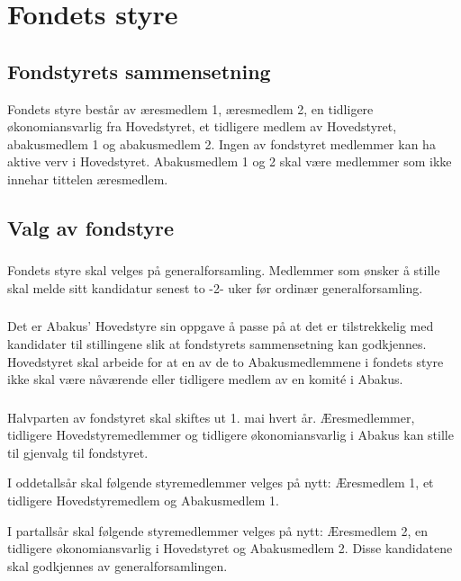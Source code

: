 \section{Fondets styre}
\subsection{Fondstyrets sammensetning}
Fondets styre består av æresmedlem 1, æresmedlem 2, en tidligere økonomiansvarlig fra 
Hovedstyret, et tidligere medlem av Hovedstyret, abakusmedlem 1 og abakusmedlem 2.
Ingen av fondstyret medlemmer kan ha aktive verv i Hovedstyret. Abakusmedlem 1 og 2 skal 
være medlemmer som ikke innehar tittelen æresmedlem. 

\subsection{Valg av fondstyre}
\subsubsection{}
Fondets styre skal velges på generalforsamling. Medlemmer som ønsker å stille skal melde 
sitt kandidatur senest to -2- uker før ordinær generalforsamling. 

\subsubsection{}
Det er Abakus’ Hovedstyre sin oppgave å passe på at det er tilstrekkelig med kandidater til 
stillingene slik at fondstyrets sammensetning kan godkjennes. Hovedstyret skal arbeide for 
at en av de to Abakusmedlemmene i fondets styre ikke skal være nåværende eller tidligere 
medlem av en komité i Abakus.

\subsubsection{}
Halvparten av fondstyret skal skiftes ut 1. mai hvert år. Æresmedlemmer, tidligere 
Hovedstyremedlemmer og tidligere økonomiansvarlig i Abakus kan stille til gjenvalg til 
fondstyret.

I oddetallsår skal følgende styremedlemmer velges på nytt: Æresmedlem 1, et tidligere 
Hovedstyremedlem og Abakusmedlem 1. 

I partallsår skal følgende styremedlemmer velges på nytt: Æresmedlem 2, en tidligere 
økonomiansvarlig i Hovedstyret og Abakusmedlem 2. 
Disse kandidatene skal godkjennes av generalforsamlingen. 
